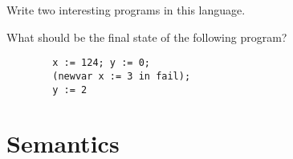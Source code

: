 \begin{exercise}
	Write two interesting programs in this language.
\end{exercise}

\begin{exercise}
	What should be the final state of the following program?
	\begin{center}
		\begin{minipage}{0.6\textwidth}
			\begin{verbatim}
        x := 124; y := 0;
        (newvar x := 3 in fail);
        y := 2
      \end{verbatim}
		\end{minipage}
	\end{center}
\end{exercise}

\section{Semantics}

